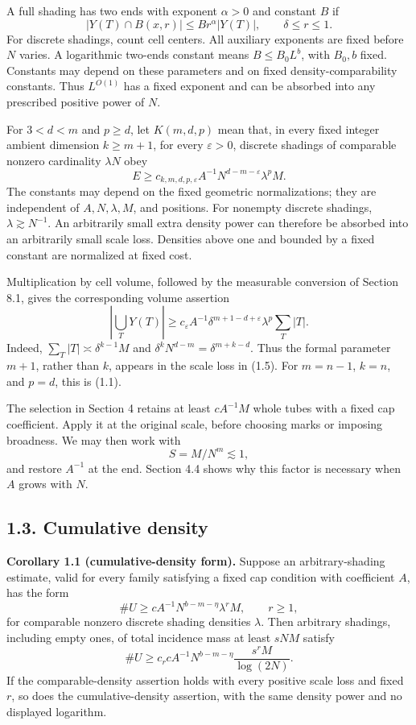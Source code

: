 \documentclass[
  11pt,
  a4paper,
]{article}
\begin{document}
A full shading has two ends with exponent \(\alpha>0\) and constant
\(B\) if \[
 |Y(T)\cap B(x,r)|\le Br^\alpha|Y(T)|,
 \qquad \delta\le r\le1.
\] For discrete shadings, count cell centers. All auxiliary exponents
are fixed before \(N\) varies. A logarithmic two-ends constant means
\(B\le B_0L^b\), with \(B_0,b\) fixed. Constants may depend on these
parameters and on fixed density-comparability constants. Thus
\(L^{O(1)}\) has a fixed exponent and can be absorbed into any
prescribed positive power of \(N\).

For \(3<d<m\) and \(p\ge d\), let \(K(m,d,p)\) mean that, in every fixed
integer ambient dimension \(k\ge m+1\), for every \(\varepsilon>0\),
discrete shadings of comparable nonzero cardinality \(\lambda N\) obey
\[
 E\ge c_{k,m,d,p,\varepsilon}
       A^{-1}N^{d-m-\varepsilon}\lambda^pM.           \tag{1.4}\label{eq:1.4}
\] The constants may depend on the fixed geometric normalizations; they
are independent of \(A,N,\lambda,M\), and positions. For nonempty
discrete shadings, \(\lambda\gtrsim N^{-1}\). An arbitrarily small extra
density power can therefore be absorbed into an arbitrarily small scale
loss. Densities above one and bounded by a fixed constant are normalized
at fixed cost.

Multiplication by cell volume, followed by the measurable conversion of
Section 8.1, gives the corresponding volume assertion \[
 \left|\bigcup_TY(T)\right|
 \ge c_\varepsilon A^{-1}\delta^{m+1-d+\varepsilon}
       \lambda^p\sum_T|T|.                          \tag{1.5}\label{eq:1.5}
\] Indeed, \(\sum_T|T|\asymp\delta^{k-1}M\) and
\(\delta^kN^{d-m}=\delta^{m+k-d}\). Thus the formal parameter \(m+1\),
rather than \(k\), appears in the scale loss in (1.5). For \(m=n-1\),
\(k=n\), and \(p=d\), this is (1.1).

The selection in Section 4 retains at least \(cA^{-1}M\) whole tubes
with a fixed cap coefficient. Apply it at the original scale, before
choosing marks or imposing broadness. We may then work with \[
 S=M/N^m\lesssim1,
\] and restore \(A^{-1}\) at the end. Section 4.4 shows why this factor
is necessary when \(A\) grows with \(N\).

\hypertarget{cumulative-density}{%
\subsection{1.3. Cumulative density}\label{cumulative-density}}

\textbf{Corollary 1.1 (cumulative-density form).} Suppose an
arbitrary-shading estimate, valid for every family satisfying a fixed
cap condition with coefficient \(A\), has the form \[
 \#U\ge cA^{-1}N^{b-m-\eta}\lambda^rM,
 \qquad r\ge1,
\] for comparable nonzero discrete shading densities \(\lambda\). Then
arbitrary shadings, including empty ones, of total incidence mass at
least \(sNM\) satisfy \[
 \#U\ge c_rcA^{-1}N^{b-m-\eta}
            \frac{s^rM}{\log(2N)}.                  \tag{1.6}\label{eq:1.6}
\] If the comparable-density assertion holds with every positive scale
loss and fixed \(r\), so does the cumulative-density assertion, with the
same density power and no displayed logarithm.
\end{document}
